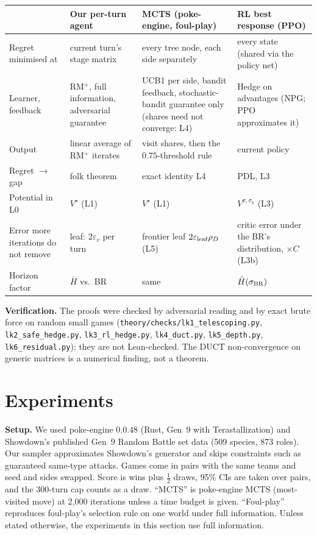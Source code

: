 \documentclass[10pt]{article}
\theoremstyle{plain}
\theoremstyle{definition}
\theoremstyle{remark}
\newcommand{\Hbar}{\bar H}
\newcommand{\epsv}{\varepsilon_v}
\begin{document}
\begin{center}\small
\begin{tabular}{@{}p{2.2cm}p{3.6cm}p{4.6cm}p{4.4cm}@{}}
\toprule
 & Our per-turn agent & MCTS (poke-engine, foul-play) & RL best response (PPO) \\
\midrule
Regret minimised at & current turn's stage matrix & every tree node, each side separately & every state (shared via the policy net) \\
Learner, feedback & RM$^+$, full information, adversarial guarantee & UCB1 per side, bandit feedback, stochastic-bandit guarantee only (shares need not converge: L4) & Hedge on advantages (NPG; PPO approximates it) \\
Output & linear average of RM$^+$ iterates & visit shares, then the $0.75$-threshold rule & current policy \\
Regret $\to$ gap & folk theorem & exact identity L4 & PDL, L3 \\
Potential in L0 & $V^\star$ (L1) & $V^\star$ (L1) & $V^{\pi,\sigma_k}$ (L3) \\
Error more iterations do not remove & leaf: $2\epsv$ per turn & frontier leaf $2\varepsilon_{\rm leaf}\rho_D$ (L5) & critic error under the BR's distribution, $\times C$ (L3b) \\
Horizon factor & $\Hbar$ vs.\ BR & same & $\Hbar(\sigma_{\rm BR})$ \\
\bottomrule
\end{tabular}
\end{center}

{\sloppy\textbf{Verification.} The proofs were checked by adversarial reading and by exact brute force on random small games (\texttt{theory/checks/\allowbreak lk1\_telescoping.py}, \allowbreak\texttt{lk2\_safe\_hedge.py}, \allowbreak\texttt{lk3\_rl\_hedge.py}, \allowbreak\texttt{lk4\_duct.py}, \allowbreak\texttt{lk5\_depth.py}, \allowbreak\texttt{lk6\_residual.py}); they are not Lean-checked. The DUCT non-convergence on generic matrices is a numerical finding, not a theorem.\par}

\section{Experiments}
\label{sec:exp}
\textbf{Setup.} We used poke-engine 0.0.48 (Rust, Gen~9 with Terastallization) and Showdown's published Gen~9 Random Battle set data (509 species, 873 roles). Our sampler approximates Showdown's generator and skips constraints such as guaranteed same-type attacks. Games come in pairs with the same teams and seed and sides swapped. Score is wins plus $\frac12$ draws, 95\% CIs are taken over pairs, and the 300-turn cap counts as a draw. ``MCTS'' is poke-engine MCTS (most-visited move) at 2,000 iterations unless a time budget is given. ``Foul-play'' reproduces foul-play's selection rule on one world under full information. Unless stated otherwise, the experiments in this section use full information.
\end{document}
